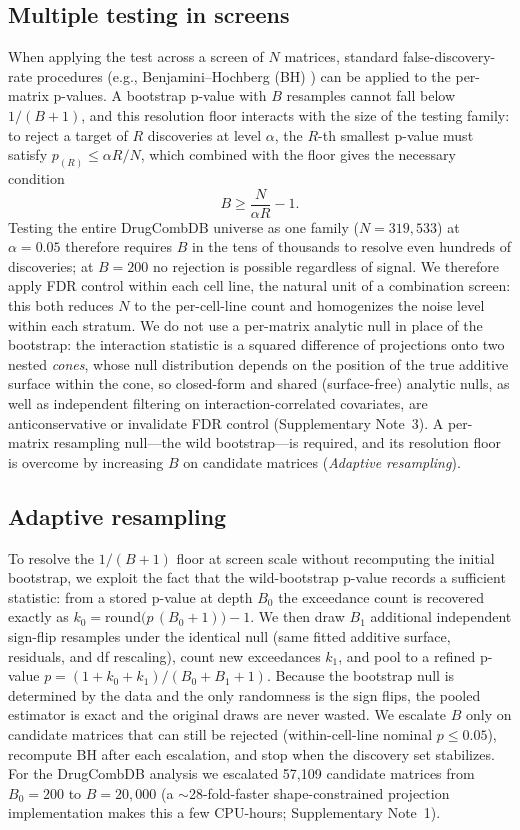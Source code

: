 \documentclass[pdflatex,sn-nature]{sn-jnl}%
\begin{document}
\subsection{Multiple testing in screens}
When applying the test across a screen of $N$ matrices, standard false-discovery-rate procedures (e.g., Benjamini--Hochberg (BH) \cite{BenjaminiHochberg1995}) can be applied to the per-matrix p-values.
A bootstrap p-value with $B$ resamples cannot fall below $1/(B+1)$, and this resolution floor interacts with the size of the testing family: to reject a target of $R$ discoveries at level $\alpha$, the $R$-th smallest p-value must satisfy $p_{(R)} \le \alpha R/N$, which combined with the floor gives the necessary condition
\begin{equation}
B \ge \frac{N}{\alpha R} - 1.
\label{eq:bmin}
\end{equation}
Testing the entire DrugCombDB universe as one family ($N=319{,}533$) at $\alpha=0.05$ therefore requires $B$ in the tens of thousands to resolve even hundreds of discoveries; at $B=200$ no rejection is possible regardless of signal.
We therefore apply FDR control within each cell line, the natural unit of a combination screen: this both reduces $N$ to the per-cell-line count and homogenizes the noise level within each stratum.
We do not use a per-matrix analytic null in place of the bootstrap: the interaction statistic is a squared difference of projections onto two nested \emph{cones}, whose null distribution depends on the position of the true additive surface within the cone, so closed-form and shared (surface-free) analytic nulls, as well as independent filtering on interaction-correlated covariates, are anticonservative or invalidate FDR control (Supplementary Note~3). A per-matrix resampling null---the wild bootstrap---is required, and its resolution floor is overcome by increasing $B$ on candidate matrices (\emph{Adaptive resampling}).

\subsection{Adaptive resampling}
To resolve the $1/(B+1)$ floor at screen scale without recomputing the initial bootstrap, we exploit the fact that the wild-bootstrap p-value records a sufficient statistic: from a stored p-value at depth $B_0$ the exceedance count is recovered exactly as $k_0 = \mathrm{round}\!\big(p\,(B_0+1)\big) - 1$.
We then draw $B_1$ additional independent sign-flip resamples under the identical null (same fitted additive surface, residuals, and df rescaling), count new exceedances $k_1$, and pool to a refined p-value $p = (1 + k_0 + k_1)/(B_0 + B_1 + 1)$.
Because the bootstrap null is determined by the data and the only randomness is the sign flips, the pooled estimator is exact and the original draws are never wasted.
We escalate $B$ only on candidate matrices that can still be rejected (within-cell-line nominal $p\le 0.05$), recompute BH after each escalation, and stop when the discovery set stabilizes.
For the DrugCombDB analysis we escalated 57{,}109 candidate matrices from $B_0=200$ to $B=20{,}000$ (a $\sim$28-fold-faster shape-constrained projection implementation makes this a few CPU-hours; Supplementary Note~1).
\end{document}
